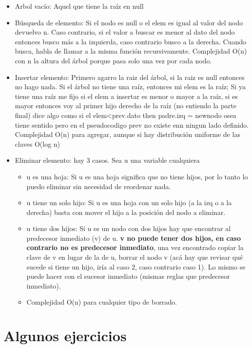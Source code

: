 \documentclass[10pt,a4paper]{article}
\begin{document}
\begin{itemize}
    \item Arbol vacío: Aquel que tiene la raíz en null
    \item Búsqueda de elemento: Si el nodo es null o el elem es igual al valor del nodo devuelvo n. Caso contrario, si el valor a buscar es menor al dato del nodo entonces busco más a la izquierda, caso contrario busco a la derecha. Cuando busca, habla de llamar a la misma función recursivamente. Complejidad O(n) con n la altura del árbol porque pasa solo una vez por cada nodo.
    \item Insertar elemento: Primero agarro la raiz del árbol, si la raiz es null entonces no hago nada. Si el árbol no tiene una raíz, entonces mi elem es la raíz; Si ya tiene una raíz me fijo si el elem a insertar es menor o mayor a la raíz, si es mayor entonces voy al primer hijo derecho de la raíz (no entiendo la parte final) dice algo como si el elem<prev.dato then padre.izq = newnodo osea tiene sentido pero en el pseudocodigo prev no existe enn ningun lado definido. Complejidad O(n) para agregar, aunque si hay distribución uniforme de las claves O(log n)
    \item Eliminar elemento: hay 3 casos. Sea u una variable cualquiera
    \begin{itemize}
        \item u es una hoja: Si u es una hoja significa que no tiene hijos, por lo tanto lo puedo eliminar sin necesidad de reordenar nada.
        \item u tiene un solo hijo: Si u es una hoja con un solo hijo (a la izq o a la derecha) basta con mover el hijo a la posición del nodo a eliminar.
        \item u tiene dos hijos: Si u es un nodo con dos hijos hay que encontrar al predecesor inmediato (v) de u. \textbf{v no puede tener dos hijos, en caso contrario no es predecesor inmediato}, una vez encontrado copiar la clave de v en lugar de la de u, borrar el nodo v (acá hay que revisar qué sucede si tiene un hijo, iría al caso 2, caso contrario caso 1). Lo mismo se puede hacer con el sucesor inmediato (mismas reglas que predecesor inmediato). 
        \item Complejidad O(n) para cualquier tipo de borrado.
    \end{itemize}
\end{itemize}


\section*{Algunos ejercicios}
\end{document}
